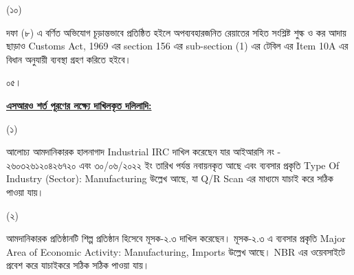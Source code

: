 \documentclass[12pt]{article}
\newcommand{\ircno}{আইআরসি নং - ২৬০৩২৬১২০৪২৬৭২০}
\newcommand{\ircrenewdt}{৩০/০৬/২০২২ ইং}
\begin{document}
\begin{minipage}[t]{0.05\linewidth}
\hspace{1em}
\end{minipage}
\begin{minipage}[t]{0.05\linewidth}
(১০)
\end{minipage}
\begin{minipage}[t]{0.9\linewidth}
দফা (৮) এ বর্ণিত অভিযোগ চূড়ান্তভাবে প্রতিষ্ঠিত হইলে
অপব্যবহারজনিত রেয়াতের সহিত সংশ্লিষ্ট শুল্ক ও কর আদায়
ছাড়াও Customs Act, 1969 এর section 156 এর
sub-section (1) এর টেবিল এর Item 10A এর বিধান
অনুযায়ী ব্যবস্থা গ্রহণ করিতে হইবে।
\\
\end{minipage}
\begin{minipage}[t]{0.05\linewidth}
০৫।
\end{minipage}
\begin{minipage}[t]{0.95\linewidth}
\underline{\textbf{এসআরও শর্ত পূরণের লক্ষ্যে
দাখিলকৃত দলিলাদি:}}
\end{minipage}
\begin{minipage}[t]{0.05\linewidth}
\hspace{0em}
\end{minipage}
\begin{minipage}[t]{0.05\linewidth}
(১)
\end{minipage}
\begin{minipage}[t]{0.90\linewidth}
আলোচ্য আমদানিকারক হালনাগাদ Industrial IRC
দাখিল করেছেন যার {\ircno} এবং
{\ircrenewdt} তারিখ পর্যন্ত নবায়নকৃত আছে এবং
ব্যবসার প্রকৃতি
Type Of Industry (Sector): Manufacturing
উল্লেখ আছে, যা Q/R Scan এর মাধ্যমে যাচাই করে
সঠিক পাওয়া যায়।
\end{minipage}
\begin{minipage}[t]{0.05\linewidth}
\hspace{0em}
\end{minipage}
\begin{minipage}[t]{0.05\linewidth}
(২)
\end{minipage}
\begin{minipage}[t]{0.90\linewidth}
আমদানিকারক প্রতিষ্ঠানটি শিল্প প্রতিষ্ঠান হিসেবে
মূসক-২.৩ দাখিল করেছেন। মূসক-২.৩ এ ব্যবসার
প্রকৃতি Major Area of Economic
Activity: Manufacturing,
Imports
উল্লেখ আছে। NBR এর ওয়েবসাইটে প্রবেশ
করে যাচাইকরে সঠিক সঠিক পাওয়া যায়।
\end{minipage}
\begin{minipage}[t]{0.05\linewidth}
\hspace{0em}
\end{minipage}
\end{document}
